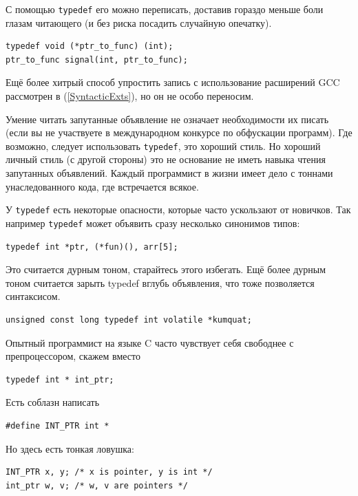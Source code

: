 \documentclass[a4paper,12pt,oneside]{article}
\begin{document}
С помощью \lstinline!typedef! его можно переписать, доставив гораздо меньше боли глазам читающего (и без риска посадить случайную опечатку).

\begin{lstlisting}
typedef void (*ptr_to_func) (int);
ptr_to_func signal(int, ptr_to_func);
\end{lstlisting}

Ещё более хитрый способ упростить запись с использование расширений GCC рассмотрен в (\ref{SyntacticExts}), но он не особо переносим.

Умение читать запутанные объявление не означает необходимости их писать (если вы не участвуете в международном конкурсе по обфускации программ). Где возможно, следует использовать \lstinline!typedef!, это хороший стиль. Но хороший личный стиль (с другой стороны) это не основание не иметь навыка чтения запутанных объявлений. Каждый программист в жизни имеет дело с тоннами унаследованного кода, где встречается всякое.

У \lstinline!typedef! есть некоторые опасности, которые часто ускользают от новичков. Так например \lstinline!typedef! может объявить сразу несколько синонимов типов:

\begin{lstlisting}
typedef int *ptr, (*fun)(), arr[5];
\end{lstlisting}

Это считается дурным тоном, старайтесь этого избегать. Ещё более дурным тоном считается зарыть typedef вглубь объявления, что тоже позволяется синтаксисом.

\begin{lstlisting}
unsigned const long typedef int volatile *kumquat;
\end{lstlisting}

Опытный программист на языке C часто чувствует себя свободнее с препроцессором, скажем вместо

\begin{lstlisting}
typedef int * int_ptr;
\end{lstlisting}

Есть соблазн написать

\begin{lstlisting}
#define INT_PTR int *
\end{lstlisting}

Но здесь есть тонкая ловушка:

\begin{lstlisting}
INT_PTR x, y; /* x is pointer, y is int */
int_ptr w, v; /* w, v are pointers */
\end{lstlisting}
\end{document}
